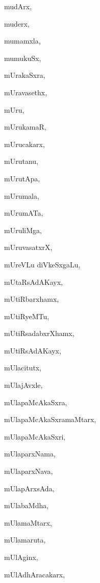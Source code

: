 \begin{multicols}{2}
{mudArx}, \pageref{mudArx}

{muderx}, \pageref{muderx}

{mumamxla}, \pageref{mumamxla}

{mumukuSx}, \pageref{mumukuSx}

{mUrakaSxra}, \pageref{mUrakaSxra}

{mUravasethx}, \pageref{mUravasethx}

{mUru}, \pageref{mUru}

{mUrukamaR}, \pageref{mUrukamaR}

{mUrucakarx}, \pageref{mUrucakarx}

{mUrutanu}, \pageref{mUrutanu}

{mUrutApa}, \pageref{mUrutApa}

{mUrumala}, \pageref{mUrumala}

{mUrumATa}, \pageref{mUrumATa}

{mUruliMga}, \pageref{mUruliMga}

{mUruvasatxrX}, \pageref{mUruvasatxrX}

{mUreVLu diVkeSx\-gaLu}, \pageref{mUreVLu diVkeSxgaLu}

{mUtaRsAdAKayx}, \pageref{mUtaRsAdAKayx}

{mUtiRbarxhamx}, \pageref{mUtiRbarxhamx}

{mUtiRyeMTu}, \pageref{mUtiRyeMTu}

{mUtiRsadabxrXhamx}, \pageref{mUtiRsadabxrXhamx}

{mUtiRsAdAKayx}, \pageref{mUtiRsAdAKayx}

{mUlacitutx}, \pageref{mUlacitutx}

{mUlajAvxle}, \pageref{mUlajAvxle}

{mUlapaMcAkaSxra}, \pageref{mUlapaMcAkaSxra}

{mUlapaMcAkaSxramaMtarx}, \pageref{mUlapaMcAkaSxramaMtarx}

{mUlapaMcAkaSxri}, \pageref{mUlapaMcAkaSxri}

{mUlaparxNama}, \pageref{mUlaparxNama}

{mUlaparxNava}, \pageref{mUlaparxNava}

{mUlapArxsAda}, \pageref{mUlapArxsAda}

{mUlabaMdha}, \pageref{mUlabaMdha}

{mUlamaMtarx}, \pageref{mUlamaMtarx}

{mUlamaruta}, \pageref{mUlamaruta}

{mUlAginx}, \pageref{mUlAginx}

{mUlAdhAracakarx}, \pageref{mUlAdhAracakarx}


\end{multicols}
